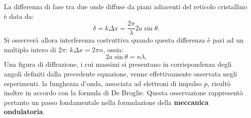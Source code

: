 \documentclass[a4paper,12pt,oneside]{book}
\begin{document}
\newpage
La differenza di fase tra due onde diffuse  da piani adiacenti del reticolo cristallino è data da:
	\begin{equation}
		\delta = k \Delta x = \frac{2 \pi}{\lambda} 2a \sin \theta.
	\end{equation}
Si osserverà allora interferenza costruttiva quando questa differenza è pari ad un multiplo intero di $2 \pi$: $k \Delta x = 2 \pi n$, ossia:
	\begin{equation}
		\boxed{
			2a \sin \theta = n\lambda.
			}
	\end{equation}
Una figura di diffrazione, i cui massimi si presentano in corrispondenza degli angoli definiti dalla precedente equazione, venne effettivamente osservata negli esperimenti. la lunghezza d'onda, associata ad elettroni di impulso $p$, risultò inoltre in accordo con la formula di De Broglie. Questa osservazione rappresentò pertanto un passo fondamentale nella formulazione della \textbf{meccanica ondulatoria}.
\end{document}
